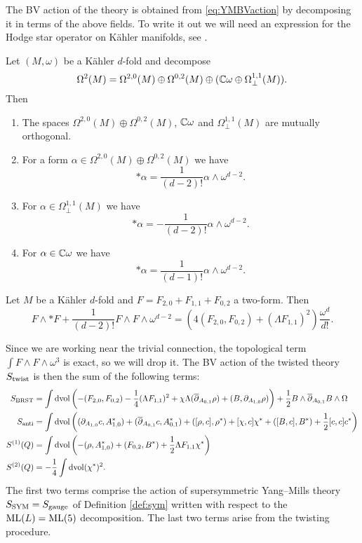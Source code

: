 \documentclass[10pt, oneside]{article}
\begin{document}
The BV action of the theory is obtained from \eqref{eq:YMBVaction} by decomposing it in terms of the above fields. To write it out we will need an expression for the Hodge star operator on K\"{a}hler manifolds, see \cite[Proposition 1.2.31]{Huybrechts}.

\begin{prop}
Let $(M, \omega)$ be a K\"{a}hler $d$-fold and decompose
\[\Omega^2(M) = \Omega^{2, 0}(M)\oplus \Omega^{0, 2}(M)\oplus (\mathbb C\omega\oplus \Omega^{1, 1}_\perp(M)).\]
Then
\begin{enumerate}
\item The spaces $\Omega^{2, 0}(M)\oplus \Omega^{0, 2}(M)$, $\mathbb C\omega$ and $\Omega^{1, 1}_\perp(M)$ are mutually orthogonal.

\item For a form $\alpha\in\Omega^{2, 0}(M)\oplus \Omega^{0, 2}(M)$ we have
\[\ast \alpha = \frac{1}{(d-2)!} \alpha\wedge \omega^{d-2}.\]

\item For $\alpha\in \Omega^{1, 1}_\perp(M)$ we have
\[\ast\alpha = -\frac{1}{(d-2)!} \alpha\wedge \omega^{d-2}.\]

\item For $\alpha\in\mathbb C\omega$ we have
\[\ast \alpha = \frac{1}{(d-1)!} \alpha\wedge \omega^{d-2}.\]
\end{enumerate}
\end{prop}

\begin{corollary} \label{Kahler_YM_term_cor}
Let $M$ be a K\"{a}hler $d$-fold and $F = F_{2, 0} + F_{1, 1} + F_{0, 2}$ a two-form. Then
\[F\wedge \ast F + \frac{1}{(d-2)!} F\wedge F\wedge \omega^{d-2} = \left(4(F_{2, 0}, F_{0, 2}) + (\Lambda F_{1, 1})^2\right) \frac{\omega^d}{d!}.\]
\end{corollary}

Since we are working near the trivial connection, the topological term $\int F\wedge F\wedge \omega^3$ is exact, so we will drop it. The BV action of the twisted theory $S_{\mathrm{twist}}$ is then the sum of the following terms:
\begin{align}
S_{\mathrm{BRST}} &= \int \operatorname{dvol} \left(-(F_{2, 0}, F_{0, 2}) - \frac{1}{4}(\Lambda F_{1, 1})^2 + \chi \Lambda(\overline{\partial}_{A_{0, 1}}\rho) + (B, \partial_{A_{1, 0}} \rho)\right)  + \frac{1}{2}B\wedge \overline{\partial}_{A_{0, 1}} B\wedge\Omega \label{eq:10dBRST} \\
S_{\mathrm{anti}} &= \int \operatorname{dvol}\left((\partial_{A_{1, 0}} c, A_{1, 0}^*) + (\overline{\partial}_{A_{0, 1}} c, A_{0, 1}^*) + ([\rho, c], \rho^*) + [\chi, c]\chi^* + ([B, c], B^*) + \frac{1}{2}[c, c]c^*\right) \label{eq:10danti} \\
S^{(1)}(Q) &= \int \operatorname{dvol}\left(-(\rho, A_{1, 0}^*) + (F_{0, 2}, B^*) + \frac{1}{2}\Lambda F_{1, 1} \chi^*\right) \\
S^{(2)}(Q) &= -\frac{1}{4}\int \operatorname{dvol} (\chi^*)^2.
\end{align}
The first two terms comprise the action of supersymmetric Yang--Mills theory $S_{\rm SYM} = S_{\rm gauge}$ of Definition \ref{def:sym} written with respect to the $\mathrm{ML}(L) = \mathrm{ML}(5)$ decomposition. 
The last two terms arise from the twisting procedure.
\end{document}
